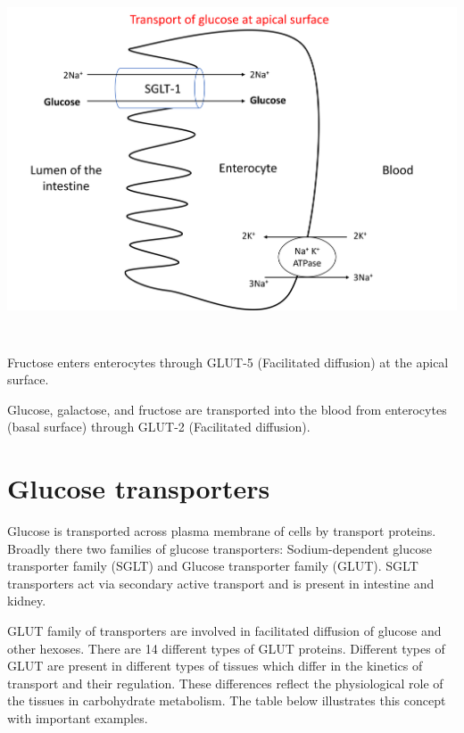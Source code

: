 \documentclass[
]{book}
\begin{document}
\includegraphics[width=\textwidth,height=4.16667in]{Images/SGLT1.png}

Fructose enters enterocytes through GLUT-5 (Facilitated diffusion) at the apical surface.

Glucose, galactose, and fructose are transported into the blood from enterocytes (basal surface) through GLUT-2 (Facilitated diffusion).

\section{Glucose transporters}\label{glucose-transporters}

Glucose is transported across plasma membrane of cells by transport proteins. Broadly there two families of glucose transporters: Sodium-dependent glucose transporter family (SGLT) and Glucose transporter family (GLUT). SGLT transporters act via secondary active transport and is present in intestine and kidney.

GLUT family of transporters are involved in facilitated diffusion of glucose and other hexoses. There are 14 different types of GLUT proteins. Different types of GLUT are present in different types of tissues which differ in the kinetics of transport and their regulation. These differences reflect the physiological role of the tissues in carbohydrate metabolism. The table below illustrates this concept with important examples.
\end{document}
